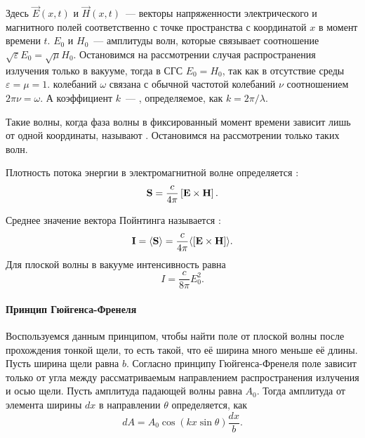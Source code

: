Здесь $\vec E(x, t)$ и $\vec H (x, t)$~---  векторы напряженности электрического и магнитного полей соответственно с точке пространства с координатой $x$ в момент времени $t$. $E_0$ и $H_0$~--- амплитуды волн, которые связывает соотношение $\sqrt{\varepsilon}E_0 = \sqrt{\mu} H_0$. Остановимся на рассмотрении случая распространения излучения только в вакууме, тогда в СГС $E_0 = H_0$, так как в отсутствие среды $\varepsilon = \mu = 1$.  колебаний $\omega$ связана с обычной частотой колебаний $\nu$ соотношением $2\pi \nu = \omega$. А коэффициент $k$~--- , определяемое, как $k = 2 \pi / \lambda$.

Такие волны, когда фаза волны в фиксированный момент времени зависит лишь от одной координаты, называют . Остановимся на рассмотрении только таких волн.

Плотность потока энергии в электромагнитной волне определяется :
\begin{equation}
    \mathbf{S} = \frac{c}{4\pi} \left[\mathbf{E} \times \mathbf{H}\right].
\end{equation}

Среднее значение вектора Пойнтинга называется :
\begin{equation}
    \mathbf{I} = \langle \mathbf{S}\rangle = \frac{c}{4\pi} \langle \left[\mathbf{E} \times \mathbf{H}\right] \rangle.
\end{equation}
Для плоской волны в вакууме интенсивность равна
\begin{equation}
    I = \frac{c}{8\pi} E_0^2.
\end{equation}

\paragraph{Принцип Гюйгенса-Френеля}

Воспользуемся данным принципом, чтобы найти поле от плоской волны после прохождения тонкой щели, то есть такой, что её ширина много меньше её длины. Пусть ширина щели равна $b$. Согласно принципу Гюйгенса-Френеля поле зависит только от угла между рассматриваемым направлением распространения излучения и осью щели. Пусть амплитуда падающей волны равна $A_0$. Тогда амплитуда от элемента ширины $dx$ в направлении $\theta$ определяется, как
\begin{equation*}
    dA = A_0 \cos (k x \sin \theta) \frac{dx}{b}.
\end{equation*}

